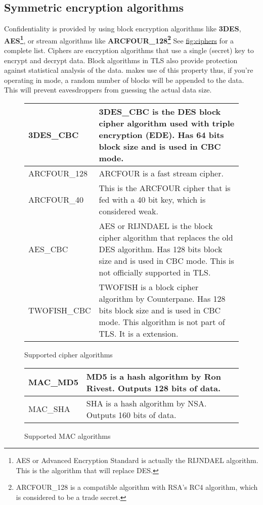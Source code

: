 \subsection{Symmetric encryption algorithms}
\par
Confidentiality is provided by using block encryption algorithms like {\bf 3DES}, 
{\bf AES\footnote{AES or Advanced Encryption Standard is actually the RIJNDAEL algorithm. This is the
algorithm that will replace DES.}}, or
stream algorithms like {\bf ARCFOUR\_128\footnote{ARCFOUR\_128 is a compatible
algorithm with RSA's RC4 algorithm, which is considered to be a trade secret.}} See \hyperref{fig:ciphers}{figure }{}{fig:ciphers} for a complete list. 
Ciphers are encryption algorithms that use a single (secret) key
to encrypt and decrypt data. Block algorithms in TLS also provide protection
against statistical analysis of the data. \gnutls{} makes use of this property
thus, if you're operating in \tlsI{} mode, a random number of blocks will be
appended to the data. This will prevent eavesdroppers from guessing the 
actual data size.

\begin{figure}[hbtp]
\begin{tabular}{|l|p{9cm}|}

\hline
3DES\_CBC & 3DES\_CBC is the DES block cipher algorithm used with triple
encryption (EDE). Has 64 bits block size and is used in CBC mode.
\\
\hline
ARCFOUR\_128 & ARCFOUR is a fast stream cipher.
\\
\hline
ARCFOUR\_40 & This is the ARCFOUR cipher that is fed with a 40 bit key,
which is considered weak.
\\
\hline
AES\_CBC & AES or RIJNDAEL is the block cipher algorithm that replaces 
the old DES algorithm. Has
128 bits block size and is used in CBC mode. This is not officially
supported in TLS.
\\
\hline
TWOFISH\_CBC & TWOFISH is a block cipher algorithm by Counterpane. Has
128 bits block size and is used in CBC mode. This algorithm is not
part of TLS. It is a \gnutls{} extension.
\\
\hline
\end{tabular}
\caption{Supported cipher algorithms}
\label{fig:ciphers}
\end{figure}



\addvspace{1.5cm}

\begin{figure}[hbtp]
\begin{tabular}{|l|p{9cm}|}

\hline
MAC\_MD5 & MD5 is a hash algorithm by Ron Rivest. Outputs 128 bits of data.
\\
\hline
MAC\_SHA & SHA is a hash algorithm by NSA. Outputs 160 bits of data.
\\
\hline
\end{tabular}
\caption{Supported MAC algorithms}
\label{fig:mac}
\end{figure}

